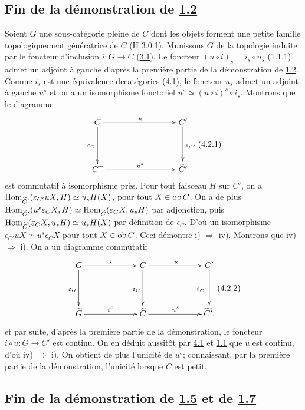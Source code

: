 \documentclass[10pt]{../fichiers-configuration-latex/smfart}
\begin{document}
\subsection{Fin de la démonstration de \hyperref[III.prop1.2]{1.2}}

Soient $G$ une sous-catégorie pleine de $C$ dont les objets
forment une petite famille topologiquement génératrice de
$C$ (II 3.0.1). Munissons $G$ de la topologie induite par le
foncteur d'inclusion $i:G\rightarrow C$ (\hyperref[III.subsec3.1]{3.1}). Le
foncteur $(u\circ i)_s=i_s\circ u_s$ (1.1.1) admet un adjoint à
gauche d'après la première partie de la démonstration de
\hyperref[III.prop1.2]{1.2}. Comme $i_s$ est une équivalence
de\pageoriginale catégories (\hyperref[III.theo4.1]{4.1}), le foncteur
$u_s$ admet un adjoint à gauche $u^s$ et on a un isomorphisme
fonctoriel $u^s\simeq (u\circ i)^s\circ i_s$. Montrons que le
diagramme
\[\vcenter{
\xymatrix@C=3cm@R=1.5cm{
C \ar[r]^{u} \ar[d]_{\epsilon_C}& C'\ar[d]^{\epsilon_{C'}}\\
C\widetilde{\phantom{a}} \ar[r]^{u^{s}}& \widetilde{C}'
}}\leqno{(4.2.1)}
\]
est commutatif à isomorphisme près. Pour tout faisceau $H$ sur
$C'$, on a\break $\operatorname{Hom}_{\widetilde{C}'}(\varepsilon_{C'}uX, H)\simeq
u_s H(X)$, pour tout $X\in \operatorname{ob} C$. On a de plus
$\operatorname{Hom}_{\widetilde{C}'}(u^s\varepsilon_CX, H)\simeq
\operatorname{Hom}_{\widetilde{C}}(\varepsilon_CX, u_s H)$ par adjonction, puis
$\operatorname{Hom}_{\widetilde{C}}(\varepsilon_C X, u_s H)\simeq u_s H(X)$ par
définition de $\epsilon_C$. D'où un isomorphisme
$\epsilon_{C'}uX\simeq u^s\epsilon_C X$ pour tout $X\in \operatorname{ob} C$. Ceci
démontre i) $\Rightarrow$ iv). Montrons que iv) $\Rightarrow$
i). On a un diagramme commutatif
\[\vcenter{
\xymatrix@C=2.25cm@R=1.5cm{ G \ar[r]^{i} \ar[d]_{\epsilon_G} & C
\ar[r]^{u} \ar[d]_{\epsilon_C}&
C' \ar[d]_{\epsilon_{C'}}\\
\widetilde{G} \ar[r]^{i^{S}}& \widetilde{C} \ar[r]^{u^S}&
\widetilde{C'}, }}\leqno{(4.2.2)}
\]
et par suite, d'après la première partie de la
démonstration, le foncteur $i\circ u:G\rightarrow C'$ est
continu. On en déduit aussitôt par \hyperref[III.theo4.1]{4.1} et
\hyperref[III.def1.1]{1.1} que $u$ est continu, d'où iv) $\Rightarrow$ i).
On obtient de plus l'unicité de $u^s$; connaissant, par la
première partie de la démonstration, l'unicité lorsque $C$
est petit.

\subsection{Fin de la démonstration de \hyperref[III.prop1.5]{1.5} et de \hyperref[III.prop1.7]{1.7}}
\pageoriginale
\end{document}
